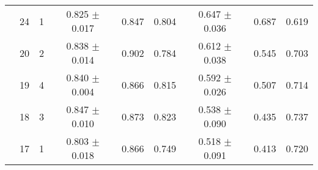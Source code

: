 \begin{tabular}{c|rr|ccc|ccc}
 &24 &      1 &   0.825 $\pm$          0.017 &    0.847 &     0.804 &    0.647 $\pm$           0.036 &     0.687 &      0.619 \\
 &20 &      2 &   0.838 $\pm$          0.014 &    0.902 &     0.784 &    0.612 $\pm$           0.038 &     0.545 &      0.703 \\
 &19 &      4 &   0.840 $\pm$          0.004 &    0.866 &     0.815 &    0.592 $\pm$           0.026 &     0.507 &      0.714 \\
 &18 &      3 &   0.847 $\pm$          0.010 &    0.873 &     0.823 &    0.538 $\pm$           0.090 &     0.435 &      0.737 \\
 &17 &      1 &   0.803 $\pm$          0.018 &    0.866 &     0.749 &    0.518 $\pm$           0.091 &     0.413 &      0.720 \\
\hline
\end{tabular}
